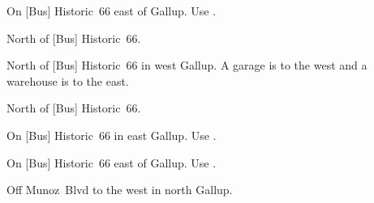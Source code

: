 
\begin{LocationList}

On [Bus] Historic~66 east of Gallup.
Use  .

North of [Bus] Historic~66.

North of [Bus] Historic~66 in west Gallup.
A garage is to the west and a warehouse is to the east.

North of [Bus] Historic~66.

\Location{\TruckService \Service}
On [Bus] Historic~66 in east Gallup.
Use  .

\Location{\TruckStop \Gas \Rest \Weigh}
On [Bus] Historic~66 east of Gallup.
Use  .

Off  Munoz~Blvd to the west in north Gallup.

\end{LocationList}
